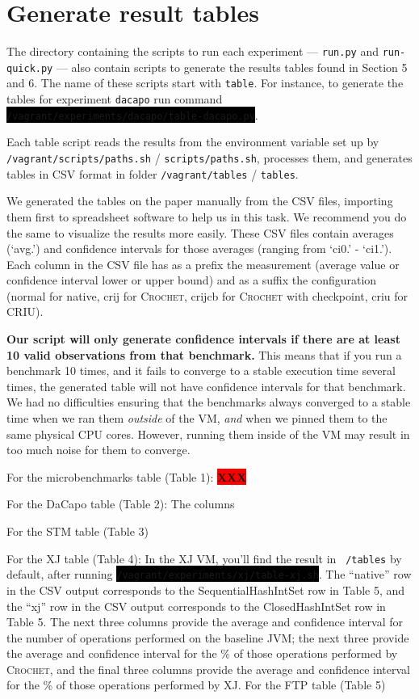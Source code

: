 \documentclass[12pt]{article}
\newcommand{\command}[1]{\colorbox{black}{\texttt{\color{white}#1}}}
\newcommand{\host}[1]{\colorbox{blue!20}{\texttt{\color{black}#1}}}
\newcommand{\vm}[1]{\colorbox{green!20}{\texttt{\color{black}#1}}}
\newcommand{\XXX}{\colorbox{red}{\bf\color{white}XXX}}
\newcommand{\sysname}{\textsc{Crochet}\xspace}
\begin{document}
\section{Generate result tables}
\label{sec:tables}

The directory containing the scripts to run each experiment --- \texttt{run.py}
and \texttt{run-quick.py} --- also contain scripts to generate the results
tables found in Section 5 and 6.  The name of these scripts start with
\texttt{table}.  For instance, to generate the tables for experiment
\texttt{dacapo} run command\linebreak
\command{/vagrant/experiments/dacapo/table-dacapo.py}.

Each table script reads the results from the environment variable set up by
\vm{/vagrant/scripts/paths.sh} / \host{scripts/paths.sh}, processes them, and
generates tables in CSV format in folder \vm{/vagrant/tables} / \host{tables}.

We generated the tables on the paper manually from the CSV files, importing them
first to spreadsheet software to help us in this task.  We recommend you do the
same to visualize the results more easily. These CSV files contain averages (`avg.') and confidence intervals for those averages (ranging from `ci0.' - `ci1.'). Each column in the CSV file has as a prefix the measurement (average value or confidence interval lower or upper bound) and as a suffix the configuration (normal for native, crij for \sysname, crijcb for \sysname with checkpoint, criu for CRIU).

\textbf{Our script will only generate confidence intervals if there are at least 10 valid observations from that benchmark.} This means that if you run a benchmark 10 times, and it fails to converge to a stable execution time several times, the generated table will not have confidence intervals for that benchmark. We had no difficulties ensuring that the benchmarks always converged to a stable time when we ran them \emph{outside} of the VM, \emph{and} when we pinned them to the same physical CPU cores. However, running them inside of the VM may result in too much noise for them to converge.

For the microbenchmarks table (Table 1):
\XXX

For the DaCapo table (Table 2): The columns

For the STM table (Table 3)

For the XJ table (Table 4): In the XJ VM, you'll find the result in \vm{~/tables} by default, after running \command{/vagrant/experiments/xj/table-xj.sh}. The ``native'' row in the CSV output corresponds to the SequentialHashIntSet row in Table 5, and the ``xj'' row in the CSV output corresponds to the ClosedHashIntSet row in Table 5. The next three columns provide the average and confidence interval for the number of operations performed on the baseline JVM; the next three provide the average and confidence interval for the \% of those operations performed by \sysname, and the final three columns provide the average and confidence interval for the \% of those operations performed by XJ.
For the FTP table (Table 5)
\end{document}
